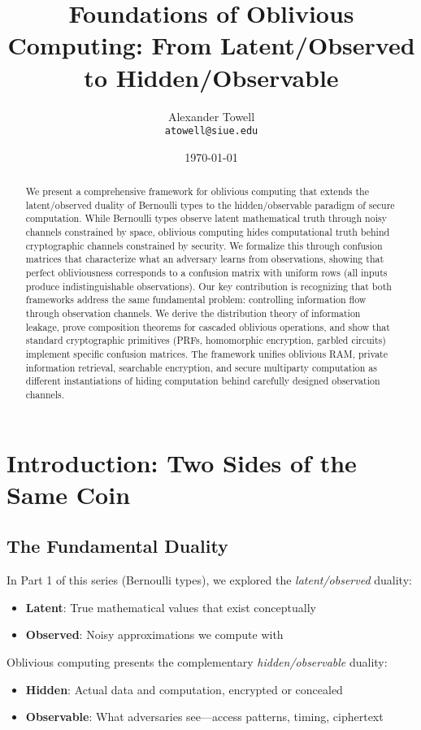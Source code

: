 \documentclass[11pt,final]{article}
\title{Foundations of Oblivious Computing: From Latent/Observed to Hidden/Observable}
\author{
    Alexander Towell\\
    \texttt{atowell@siue.edu}
}
\date{\today}
\begin{document}
\maketitle

\begin{abstract}
We present a comprehensive framework for oblivious computing that extends the latent/observed duality of Bernoulli types to the hidden/observable paradigm of secure computation. While Bernoulli types observe latent mathematical truth through noisy channels constrained by space, oblivious computing hides computational truth behind cryptographic channels constrained by security. We formalize this through confusion matrices that characterize what an adversary learns from observations, showing that perfect obliviousness corresponds to a confusion matrix with uniform rows (all inputs produce indistinguishable observations). Our key contribution is recognizing that both frameworks address the same fundamental problem: controlling information flow through observation channels. We derive the distribution theory of information leakage, prove composition theorems for cascaded oblivious operations, and show that standard cryptographic primitives (PRFs, homomorphic encryption, garbled circuits) implement specific confusion matrices. The framework unifies oblivious RAM, private information retrieval, searchable encryption, and secure multiparty computation as different instantiations of hiding computation behind carefully designed observation channels.
\end{abstract}

\section{Introduction: Two Sides of the Same Coin}

\subsection{The Fundamental Duality}

In Part 1 of this series (Bernoulli types), we explored the \textit{latent/observed} duality:
\begin{itemize}
\item \textbf{Latent}: True mathematical values that exist conceptually
\item \textbf{Observed}: Noisy approximations we compute with
\end{itemize}

Oblivious computing presents the complementary \textit{hidden/observable} duality:
\begin{itemize}
\item \textbf{Hidden}: Actual data and computation, encrypted or concealed
\item \textbf{Observable}: What adversaries see—access patterns, timing, ciphertext
\end{itemize}
\end{document}

